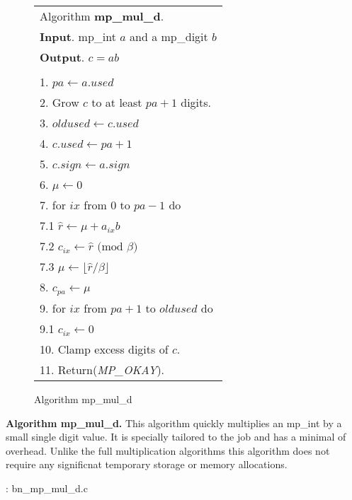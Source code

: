 \documentclass[b5paper]{book}
\begin{document}
\begin{figure}[!here]
\begin{small}
\begin{center}
\begin{tabular}{l}
\hline Algorithm \textbf{mp\_mul\_d}. \\
\textbf{Input}.   mp\_int $a$ and a mp\_digit $b$ \\
\textbf{Output}.  $c = ab$ \\
\hline \\
1.  $pa \leftarrow a.used$ \\
2.  Grow $c$ to at least $pa + 1$ digits. \\
3.  $oldused \leftarrow c.used$ \\
4.  $c.used \leftarrow pa + 1$ \\
5.  $c.sign \leftarrow a.sign$ \\
6.  $\mu \leftarrow 0$ \\
7.  for $ix$ from $0$ to $pa - 1$ do \\
\hspace{3mm}7.1  $\hat r \leftarrow \mu + a_{ix}b$ \\
\hspace{3mm}7.2  $c_{ix} \leftarrow \hat r \mbox{ (mod }\beta\mbox{)}$ \\
\hspace{3mm}7.3  $\mu \leftarrow \lfloor \hat r / \beta \rfloor$ \\
8.  $c_{pa} \leftarrow \mu$ \\
9.  for $ix$ from $pa + 1$ to $oldused$ do \\
\hspace{3mm}9.1  $c_{ix} \leftarrow 0$ \\
10.  Clamp excess digits of $c$. \\
11.  Return(\textit{MP\_OKAY}). \\
\hline
\end{tabular}
\end{center}
\end{small}
\caption{Algorithm mp\_mul\_d}
\end{figure}
\textbf{Algorithm mp\_mul\_d.}
This algorithm quickly multiplies an mp\_int by a small single digit value.  It is specially tailored to the job and has a minimal of overhead.  
Unlike the full multiplication algorithms this algorithm does not require any significnat temporary storage or memory allocations.  

\vspace{+3mm}\begin{small}
\hspace{-5.1mm}{\bf File}: bn\_mp\_mul\_d.c
\vspace{-3mm}
\begin{alltt}
\end{alltt}
\end{small}
\end{document}
